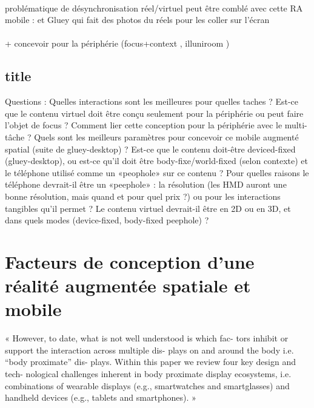\paragraph*{}
problématique de désynchronisation réel/virtuel peut être comblé avec cette RA mobile : \cite{Chalon2004} et Gluey qui fait des photos du réels pour les coller sur l'écran

\paragraph*{}
+ concevoir pour la périphérie (focus+context \cite{CockburnKarlsonBederson2009}, illuniroom \cite{JonesBenkoOfekEtAl2013})


\subsection*{title}
Questions : Quelles interactions sont les meilleures pour quelles taches ? Est-ce que le contenu virtuel doit être conçu seulement pour la périphérie ou peut faire l'objet de focus ? Comment lier cette conception pour la périphérie avec le multi-tâche ? Quels sont les meilleurs paramètres pour concevoir ce mobile augmenté spatial (suite de gluey-desktop) ? Est-ce que le contenu doit-être deviced-fixed (gluey-desktop), ou est-ce qu'il doit être body-fixe/world-fixed (selon contexte) et le téléphone utilisé comme un «peophole» sur ce contenu ? Pour quelles raisons le téléphone devrait-il être un «peephole» : la résolution (les HMD auront une bonne résolution, mais quand et pour quel prix ?) ou pour les interactions tangibles qu'il permet ? Le contenu virtuel devrait-il être en 2D ou en 3D, et dans quels modes (device-fixed, body-fixed peephole) ? 


\section*{Facteurs de conception d'une réalité augmentée spatiale et mobile}
« However, to date, what is not well understood is which fac-
tors inhibit or support the interaction across multiple dis-
plays on and around the body i.e. “body proximate” dis-
plays. Within this paper we review four key design and tech-
nological challenges inherent in body proximate display
ecosystems, i.e. combinations of wearable displays (e.g.,
smartwatches and smartglasses) and handheld devices
(e.g., tablets and smartphones). » \cite{GrubertKranzQuigley2015} %

